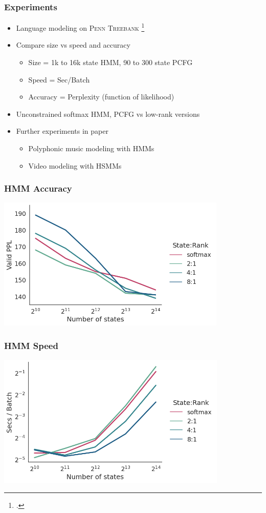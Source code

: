 \documentclass{beamer}
\begin{document}
\begin{frame}
\frametitle{Experiments}
\begin{itemize}
\item Language modeling on \textsc{Penn Treebank} \footcite{ptb}
\vspace{1em}
\item Compare size vs speed and accuracy
    \begin{itemize}
    \item Size = 1k to 16k state HMM, 90 to 300 state PCFG
    \item Speed = Sec/Batch
    \item Accuracy = Perplexity (function of likelihood)
    \end{itemize}
\vspace{1em}
\item Unconstrained softmax HMM, PCFG vs low-rank versions %
\vspace{1em}
\item Further experiments in paper
    \begin{itemize}
    \item Polyphonic music modeling with HMMs
    \item Video modeling with HSMMs
    \end{itemize}
\end{itemize}
\end{frame}

\begin{frame}
\frametitle{HMM Accuracy}
\centering
\includegraphics[height=2.5in]{imgs/hmm/lhmm-states-features-dropout.png}
\end{frame}

\begin{frame}
\frametitle{HMM Speed}
\centering
\includegraphics[height=2.5in]{imgs/hmm/lhmm-states-features-speed.png}
\end{frame}
\end{document}
